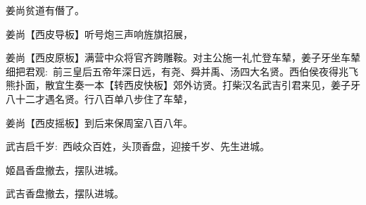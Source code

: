 {\textrm{姜尚\hspace{30pt}贫道有僭了。}

\textrm{姜尚\hspace{30pt}【{\akai 西皮导板}】听号炮三声响旌旗招展，}

\setlength{\hangindent}{56pt}   %
{\textrm{姜尚\hspace{30pt}【{\akai 西皮原板}】满营中众将官齐跨雕鞍。对主公施一礼忙登车辇，姜子牙坐车辇细把君观:~前三皇后五帝年深日远，有尧、舜并禹、汤四大名贤。西伯侯夜得兆飞熊扑面，散宜生奏一本【{\footnotesize 转}{\akai 西皮快板}】郊外访贤。打柴汉名武吉引君来见，姜子牙八十二才遇名贤。行八百单八步住了车辇，}}

\textrm{姜尚\hspace{30pt}【{\akai 西皮摇板}】到后来保周室八百八年。}

\textrm{武吉\hspace{30pt}启千岁:~西岐众百姓，头顶香盘，迎接千岁、先生进城。}

\textrm{姬昌\hspace{30pt}香盘撤去，摆队进城。}

\textrm{武吉\hspace{30pt}香盘撤去，摆队进城。}
}

